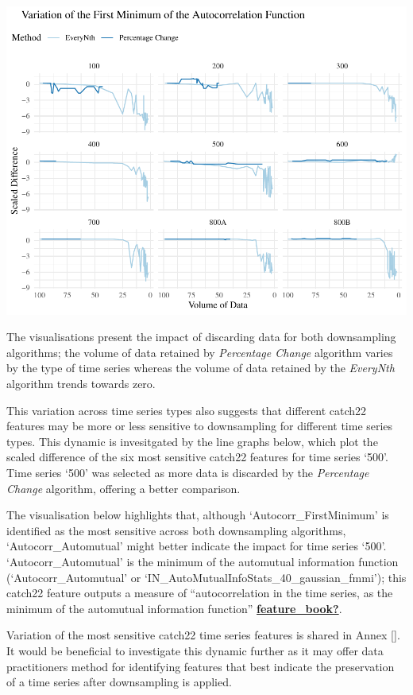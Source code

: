 \documentclass{article}
\begin{document}
\includegraphics{210431461_CSC8639_Dissertation_files/figure-latex/FirstMinimum-1.pdf}

The visualisations present the impact of discarding data for both
downsampling algorithms; the volume of data retained by \emph{Percentage
Change} algorithm varies by the type of time series whereas the volume
of data retained by the \emph{EveryNth} algorithm trends towards zero.

This variation across time series types also suggests that different
catch22 features may be more or less sensitive to downsampling for
different time series types. This dynamic is invesitgated by the line
graphs below, which plot the scaled difference of the six most sensitive
catch22 features for time series `500'. Time series `500' was selected
as more data is discarded by the \emph{Percentage Change} algorithm,
offering a better comparison.

The visualisation below highlights that, although
`Autocorr\_FirstMinimum' is identified as the most sensitive across both
downsampling algorithms, `Autocorr\_Automutual' might better indicate
the impact for time series `500'. `Autocorr\_Automutual' is the minimum
of the automutual information function (`Autocorr\_Automutual' or
`IN\_AutoMutualInfoStats\_40\_gaussian\_fmmi'); this catch22 feature
outputs a measure of ``autocorrelation in the time series, as the
minimum of the automutual information function''
\protect\hyperlink{ref-feature_book}{\textbf{feature\_book?}}.

Variation of the most sensitive catch22 time series features is shared
in Annex {[}{]}. It would be beneficial to investigate this dynamic
further as it may offer data practitioners method for identifying
features that best indicate the preservation of a time series after
downsampling is applied.
\end{document}
